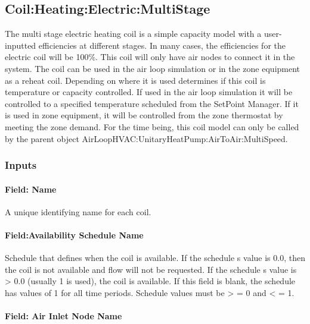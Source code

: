 \subsection{Coil:Heating:Electric:MultiStage}\label{coilheatingelectricmultistage}

The multi stage electric heating coil is a simple capacity model with a user-inputted efficiencies at different stages. In many cases, the efficiencies for the electric coil will be 100\%. This coil will only have air nodes to connect it in the system. The coil can be used in the air loop simulation or in the zone equipment as a reheat coil. Depending on where it is used determines if this coil is temperature or capacity controlled. If used in the air loop simulation it will be controlled to a specified temperature scheduled from the SetPoint Manager. If it is used in zone equipment, it will be controlled from the zone thermostat by meeting the zone demand. For the time being, this coil model can only be called by the parent object AirLoopHVAC:UnitaryHeatPump:AirToAir:MultiSpeed.

\subsubsection{Inputs}\label{inputs-4-015}

\paragraph{Field: Name}\label{field-name-4-012}

A unique identifying name for each coil.

\paragraph{Field:Availability Schedule Name}\label{fieldavailability-schedule-name-4}

Schedule that defines when the coil is available. If the schedule s value is 0.0, then the coil is not available and flow will not be requested. If the schedule s value is \textgreater{} 0.0 (usually 1 is used), the coil is available. If this field is blank, the schedule has values of 1 for all time periods. Schedule values must be \textgreater{} = 0 and \textless{} = 1.

\paragraph{Field: Air Inlet Node Name}\label{field-air-inlet-node-name-4-001}

